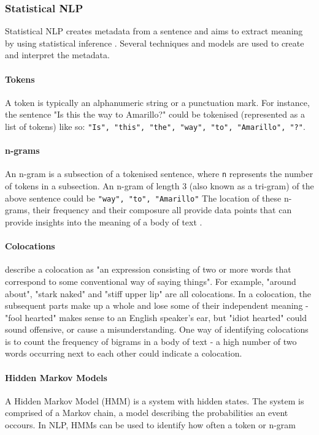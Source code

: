 \subsubsection{Statistical NLP}
Statistical NLP creates metadata from a sentence and aims to extract meaning by using statistical inference \cite{manning1999}. Several techniques and models are used to create and interpret the metadata.

\paragraph{Tokens}
A token is typically an alphanumeric string or a punctuation mark. For instance, the sentence "Is this the way to Amarillo?" could be tokenised (represented as a list of tokens) like so: \texttt{"Is", "this", "the", "way", "to", "Amarillo", "?"}.\par
	
\paragraph{n-grams}
An n-gram is a subsection of a tokenised sentence, where \texttt{n} represents the number of tokens in a subsection. An n-gram of length 3 (also known as a tri-gram) of the above sentence could be \texttt{"way", "to", "Amarillo"}
	The location of these n-grams, their frequency and their composure all provide data points that can provide insights into the meaning of a body of text \cite{banerjee2003}.
	
\paragraph{Colocations}
\citeauthor{manning1999} describe a colocation as "an expression consisting of two or more words that correspond to some conventional way of saying things". For example, "around about", "stark naked" and "stiff upper lip" are all colocations. In a colocation, the subsequent parts make up a whole and lose some of their independent meaning - "fool hearted" makes sense to an English speaker's ear, but "idiot hearted" could sound offensive, or cause a misunderstanding.
	One way of identifying colocations is to count the frequency of bigrams in a body of text - a high number of two words occurring next to each other could indicate a colocation.

\paragraph{Hidden Markov Models} A Hidden Markov Model (HMM) is a system with hidden states. The system is comprised of a Markov chain, a model describing the probabilities an event occours. In NLP, HMMs can be used to identify how often a token or n-gram  


